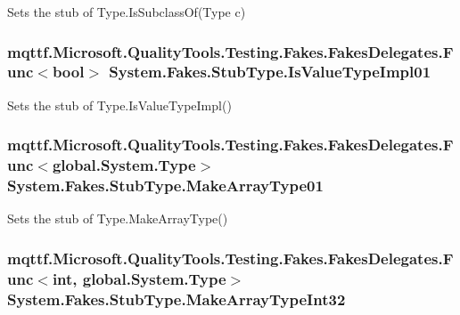 Sets the stub of Type.\-Is\-Subclass\-Of(\-Type c)

\hypertarget{class_system_1_1_fakes_1_1_stub_type_a19714871220a85a6167c3234ee9d1624}{
\subsubsection[{Is\-Value\-Type\-Impl01}]{\setlength{\rightskip}{0pt plus 5cm}mqttf.\-Microsoft.\-Quality\-Tools.\-Testing.\-Fakes.\-Fakes\-Delegates.\-Func$<$bool$>$ System.\-Fakes.\-Stub\-Type.\-Is\-Value\-Type\-Impl01}}\label{class_system_1_1_fakes_1_1_stub_type_a19714871220a85a6167c3234ee9d1624}


Sets the stub of Type.\-Is\-Value\-Type\-Impl()

\hypertarget{class_system_1_1_fakes_1_1_stub_type_ae2e230665a65d19ff0bff67ff1175abb}{
\subsubsection[{Make\-Array\-Type01}]{\setlength{\rightskip}{0pt plus 5cm}mqttf.\-Microsoft.\-Quality\-Tools.\-Testing.\-Fakes.\-Fakes\-Delegates.\-Func$<$global.\-System.\-Type$>$ System.\-Fakes.\-Stub\-Type.\-Make\-Array\-Type01}}\label{class_system_1_1_fakes_1_1_stub_type_ae2e230665a65d19ff0bff67ff1175abb}


Sets the stub of Type.\-Make\-Array\-Type()

\hypertarget{class_system_1_1_fakes_1_1_stub_type_ab0a5fd3183b98b432e17a9e6b6bdfee0}{
\subsubsection[{Make\-Array\-Type\-Int32}]{\setlength{\rightskip}{0pt plus 5cm}mqttf.\-Microsoft.\-Quality\-Tools.\-Testing.\-Fakes.\-Fakes\-Delegates.\-Func$<$int, global.\-System.\-Type$>$ System.\-Fakes.\-Stub\-Type.\-Make\-Array\-Type\-Int32}}\label{class_system_1_1_fakes_1_1_stub_type_ab0a5fd3183b98b432e17a9e6b6bdfee0}


